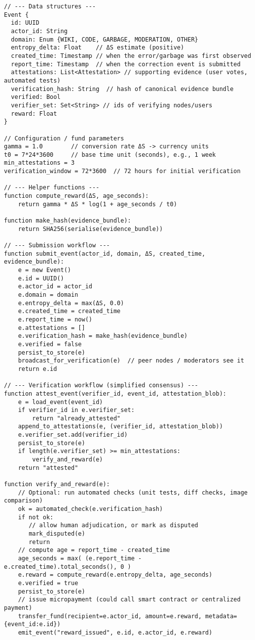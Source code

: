 \documentclass[12pt]{article}
\begin{document}
\begin{verbatim}
// --- Data structures ---
Event {
  id: UUID
  actor_id: String
  domain: Enum {WIKI, CODE, GARBAGE, MODERATION, OTHER}
  entropy_delta: Float    // ΔS estimate (positive)
  created_time: Timestamp // when the error/garbage was first observed
  report_time: Timestamp  // when the correction event is submitted
  attestations: List<Attestation> // supporting evidence (user votes, automated tests)
  verification_hash: String  // hash of canonical evidence bundle
  verified: Bool
  verifier_set: Set<String> // ids of verifying nodes/users
  reward: Float
}

// Configuration / fund parameters
gamma = 1.0        // conversion rate ΔS -> currency units
t0 = 7*24*3600     // base time unit (seconds), e.g., 1 week
min_attestations = 3
verification_window = 72*3600  // 72 hours for initial verification

// --- Helper functions ---
function compute_reward(ΔS, age_seconds):
    return gamma * ΔS * log(1 + age_seconds / t0)

function make_hash(evidence_bundle):
    return SHA256(serialise(evidence_bundle))

// --- Submission workflow ---
function submit_event(actor_id, domain, ΔS, created_time, evidence_bundle):
    e = new Event()
    e.id = UUID()
    e.actor_id = actor_id
    e.domain = domain
    e.entropy_delta = max(ΔS, 0.0)
    e.created_time = created_time
    e.report_time = now()
    e.attestations = []
    e.verification_hash = make_hash(evidence_bundle)
    e.verified = false
    persist_to_store(e)
    broadcast_for_verification(e)  // peer nodes / moderators see it
    return e.id

// --- Verification workflow (simplified consensus) ---
function attest_event(verifier_id, event_id, attestation_blob):
    e = load_event(event_id)
    if verifier_id in e.verifier_set:
        return "already_attested"
    append_to_attestations(e, (verifier_id, attestation_blob))
    e.verifier_set.add(verifier_id)
    persist_to_store(e)
    if length(e.verifier_set) >= min_attestations:
        verify_and_reward(e)
    return "attested"

function verify_and_reward(e):
    // Optional: run automated checks (unit tests, diff checks, image comparison)
    ok = automated_check(e.verification_hash)
    if not ok:
       // allow human adjudication, or mark as disputed
       mark_disputed(e)
       return
    // compute age = report_time - created_time
    age_seconds = max( (e.report_time - e.created_time).total_seconds(), 0 )
    e.reward = compute_reward(e.entropy_delta, age_seconds)
    e.verified = true
    persist_to_store(e)
    // issue micropayment (could call smart contract or centralized payment)
    transfer_fund(recipient=e.actor_id, amount=e.reward, metadata={event_id:e.id})
    emit_event("reward_issued", e.id, e.actor_id, e.reward)


\end{verbatim}
\end{document}
